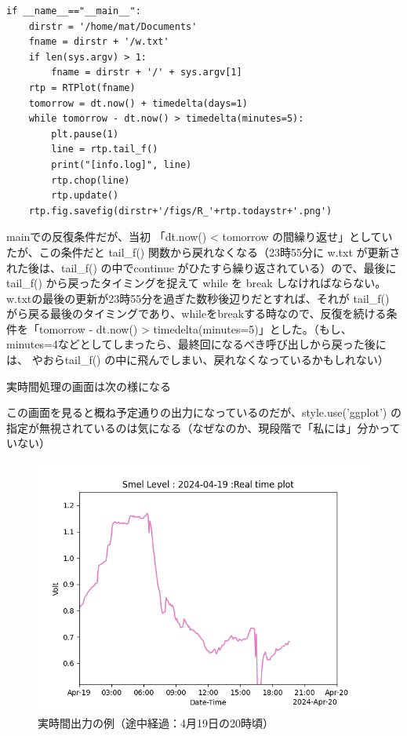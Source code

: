 \documentclass[12pt,a4paper,uplatex]{jsarticle}
\begin{document}
\begin{breakbox}
\begin{verbatim}
if __name__=="__main__":
    dirstr = '/home/mat/Documents'
    fname = dirstr + '/w.txt'
    if len(sys.argv) > 1:
        fname = dirstr + '/' + sys.argv[1]
    rtp = RTPlot(fname)
    tomorrow = dt.now() + timedelta(days=1)
    while tomorrow - dt.now() > timedelta(minutes=5):
        plt.pause(1)
        line = rtp.tail_f()
        print("[info.log]", line)
        rtp.chop(line)
        rtp.update()
    rtp.fig.savefig(dirstr+'/figs/R_'+rtp.todaystr+'.png')
	\end{verbatim}
\end{breakbox}

mainでの反復条件だが、当初 「dt.now() < tomorrow の間繰り返せ」としていたが、この条件だと tail\_f() 関数から戻れなくなる（23時55分に w.txt が更新された後は、tail\_f() の中でcontinue がひたすら繰り返されている）ので、最後に tail\_f() から戻ったタイミングを捉えて while を break しなければならない。w.txtの最後の更新が23時55分を過ぎた数秒後辺りだとすれば、それが tail\_f() がら戻る最後のタイミングであり、whileをbreakする時なので、反復を続ける条件を「tomorrow - dt.now() > timedelta(minutes=5)」とした。（もし、minutes=4などとしてしまったら、最終回になるべき呼び出しから戻った後には、 やおらtail\_f() の中に飛んでしまい、戻れなくなっているかもしれない）

実時間処理の画面は次の様になる

この画面を見ると概ね予定通りの出力になっているのだが、style.use('ggplot') の指定が無視されているのは気になる（なぜなのか、現段階で「私には」分かっていない）

\begin{figure}[htbp]
	\begin{minipage}[b]{1.0\linewidth}
		\centering
		\includegraphics[keepaspectratio, scale=0.8]{figs/png/Figure_1.png}
		\caption{実時間出力の例（途中経過：4月19日の20時頃）}
	\end{minipage}
\end{figure}
\end{document}
